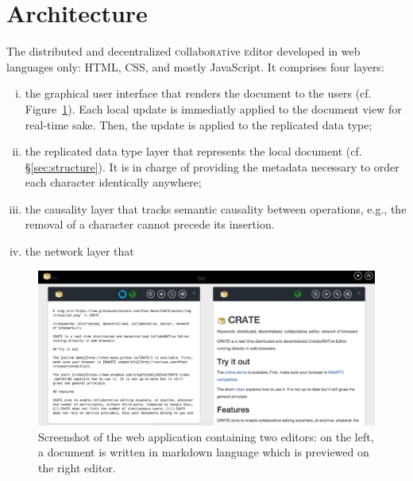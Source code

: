 
\section{Architecture}
\label{sec:architecture}

The distributed and decentralized \textsc{c}ollabo\textsc{rat}ive
\textsc{e}ditor \CRATE developed in web languages only: HTML, CSS, and mostly
JavaScript. It comprises four layers:
\begin{enumerate}[(i)]
\item the graphical user interface that renders the document to the users
  (cf. Figure~\ref{img:screenshot}). Each local update is immediatly applied to
  the document view for real-time sake. Then, the update is applied to the
  replicated data type;
\item the replicated data type layer that represents the local document
  (cf. §\ref{sec:structure}). It is in charge of providing the metadata
  necessary to order each character identically anywhere;
\item the causality layer that tracks semantic causality between operations,
  e.g., the removal of a character cannot precede its insertion.
\item the network layer that
\end{enumerate}

\begin{figure}
  \includegraphics[width=\textwidth]{./img/screenshot.png}
  \caption{\label{img:screenshot} Screenshot of the web application containing
    two editors: on the left, a document is written in markdown language which
    is previewed on the right editor.}
\end{figure}


